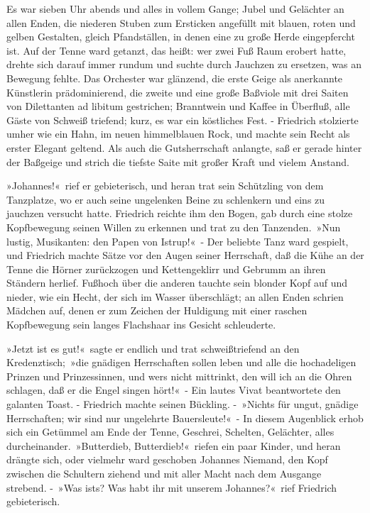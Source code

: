Es war sieben Uhr abends und alles in vollem Gange; Jubel und Gelächter an allen Enden, die niederen Stuben zum Ersticken angefüllt mit blauen, roten und gelben Gestalten, gleich Pfandställen, in denen eine zu große Herde eingepfercht ist. Auf der Tenne ward getanzt, das heißt: wer zwei Fuß Raum erobert hatte, drehte sich darauf immer rundum und suchte durch Jauchzen zu ersetzen, was an Bewegung fehlte. Das Orchester war glänzend, die erste Geige als anerkannte Künstlerin prädominierend, die zweite und eine große Baßviole mit drei Saiten von Dilettanten ad libitum gestrichen; Branntwein und Kaffee in Überfluß, alle Gäste von Schweiß triefend; kurz, es war ein köstliches Fest. - Friedrich stolzierte umher wie ein Hahn, im neuen himmelblauen Rock, und machte sein Recht als erster Elegant geltend. Als auch die Gutsherrschaft anlangte, saß er gerade hinter der Baßgeige und strich die tiefste Saite mit großer Kraft und vielem Anstand.

»Johannes!« rief er gebieterisch, und heran trat sein Schützling von dem Tanzplatze, wo er auch seine ungelenken Beine zu schlenkern und eins zu jauchzen versucht hatte. Friedrich reichte ihm den Bogen, gab durch eine stolze Kopfbewegung seinen Willen zu erkennen und trat zu den Tanzenden. »Nun lustig, Musikanten: den Papen von Istrup!« - Der beliebte Tanz ward gespielt, und Friedrich machte Sätze vor den Augen seiner Herrschaft, daß die Kühe an der Tenne die Hörner zurückzogen und Kettengeklirr und Gebrumm an ihren Ständern herlief. Fußhoch über die anderen tauchte sein blonder Kopf auf und nieder, wie ein Hecht, der sich im Wasser überschlägt; an allen Enden schrien Mädchen auf, denen er zum Zeichen der Huldigung mit einer raschen Kopfbewegung sein langes Flachshaar ins Gesicht schleuderte.

»Jetzt ist es gut!« sagte er endlich und trat schweißtriefend an den Kredenztisch; »die gnädigen Herrschaften sollen leben und alle die hochadeligen Prinzen und Prinzessinnen, und wers nicht mittrinkt, den will ich an die Ohren schlagen, daß er die Engel singen hört!« - Ein lautes Vivat beantwortete den galanten Toast. - Friedrich machte seinen Bückling. - »Nichts für ungut, gnädige Herrschaften; wir sind nur ungelehrte Bauersleute!« - In diesem Augenblick erhob sich ein Getümmel am Ende der Tenne, Geschrei, Schelten, Gelächter, alles durcheinander. »Butterdieb, Butterdieb!« riefen ein paar Kinder, und heran drängte sich, oder vielmehr ward geschoben Johannes Niemand, den Kopf zwischen die Schultern ziehend und mit aller Macht nach dem Ausgange strebend. - »Was ists? Was habt ihr mit unserem Johannes?« rief Friedrich gebieterisch.


